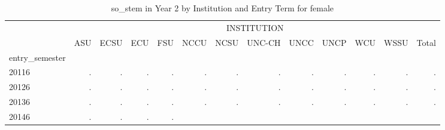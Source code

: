 \begin{table}[!h]
\caption{so\_stem in Year 2 by Institution and Entry Term for female}
\centering
\begin{tabular}{lllllllllllll}
\cline{1-13}
\multicolumn{1}{c}{} &
  \multicolumn{12}{|c}{INSTITUTION} \\
\multicolumn{1}{c}{} &
  \multicolumn{1}{|r}{ASU} &
  \multicolumn{1}{r}{ECSU} &
  \multicolumn{1}{r}{ECU} &
  \multicolumn{1}{r}{FSU} &
  \multicolumn{1}{r}{NCCU} &
  \multicolumn{1}{r}{NCSU} &
  \multicolumn{1}{r}{UNC-CH} &
  \multicolumn{1}{r}{UNCC} &
  \multicolumn{1}{r}{UNCP} &
  \multicolumn{1}{r}{WCU} &
  \multicolumn{1}{r}{WSSU} &
  \multicolumn{1}{r}{Total} \\
\cline{1-13}
\multicolumn{1}{l}{entry\_semester} &
  \multicolumn{1}{|r}{} &
  \multicolumn{1}{r}{} &
  \multicolumn{1}{r}{} &
  \multicolumn{1}{r}{} &
  \multicolumn{1}{r}{} &
  \multicolumn{1}{r}{} &
  \multicolumn{1}{r}{} &
  \multicolumn{1}{r}{} &
  \multicolumn{1}{r}{} &
  \multicolumn{1}{r}{} &
  \multicolumn{1}{r}{} &
  \multicolumn{1}{r}{} \\
\multicolumn{1}{l}{\hspace{1em}20116} &
  \multicolumn{1}{|r}{.} &
  \multicolumn{1}{r}{.} &
  \multicolumn{1}{r}{.} &
  \multicolumn{1}{r}{.} &
  \multicolumn{1}{r}{.} &
  \multicolumn{1}{r}{.} &
  \multicolumn{1}{r}{.} &
  \multicolumn{1}{r}{.} &
  \multicolumn{1}{r}{.} &
  \multicolumn{1}{r}{.} &
  \multicolumn{1}{r}{.} &
  \multicolumn{1}{r}{.} \\
\multicolumn{1}{l}{\hspace{1em}20126} &
  \multicolumn{1}{|r}{.} &
  \multicolumn{1}{r}{.} &
  \multicolumn{1}{r}{.} &
  \multicolumn{1}{r}{.} &
  \multicolumn{1}{r}{.} &
  \multicolumn{1}{r}{.} &
  \multicolumn{1}{r}{.} &
  \multicolumn{1}{r}{.} &
  \multicolumn{1}{r}{.} &
  \multicolumn{1}{r}{.} &
  \multicolumn{1}{r}{.} &
  \multicolumn{1}{r}{.} \\
\multicolumn{1}{l}{\hspace{1em}20136} &
  \multicolumn{1}{|r}{.} &
  \multicolumn{1}{r}{.} &
  \multicolumn{1}{r}{.} &
  \multicolumn{1}{r}{.} &
  \multicolumn{1}{r}{.} &
  \multicolumn{1}{r}{.} &
  \multicolumn{1}{r}{.} &
  \multicolumn{1}{r}{.} &
  \multicolumn{1}{r}{.} &
  \multicolumn{1}{r}{.} &
  \multicolumn{1}{r}{.} &
  \multicolumn{1}{r}{.} \\
\multicolumn{1}{l}{\hspace{1em}20146} &
  \multicolumn{1}{|r}{.} &
  \multicolumn{1}{r}{.} &
  \multicolumn{1}{r}{.} &
  \multicolumn{1}{r}{.} &

\end{tabular}
\end{table}
